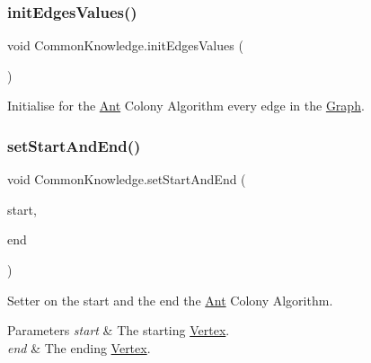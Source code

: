 \subsubsection{\texorpdfstring{init\+Edges\+Values()}{initEdgesValues()}}
{\footnotesize\ttfamily void Common\+Knowledge.\+init\+Edges\+Values (\begin{DoxyParamCaption}{ }\end{DoxyParamCaption})\hspace{0.3cm}{\ttfamily [inline]}}



Initialise for the \hyperlink{classAnt}{Ant} Colony Algorithm every edge in the \hyperlink{classGraph}{Graph}. 

\mbox{\label{classCommonKnowledge_aa62a58eb879f2b8e331ca27f9294162e}} 
\subsubsection{\texorpdfstring{set\+Start\+And\+End()}{setStartAndEnd()}}
{\footnotesize\ttfamily void Common\+Knowledge.\+set\+Start\+And\+End (\begin{DoxyParamCaption}\item[{\hyperlink{classVertexNode}{Vertex\+Node}}]{start,  }\item[{\hyperlink{classVertexNode}{Vertex\+Node}}]{end }\end{DoxyParamCaption})\hspace{0.3cm}{\ttfamily [inline]}}



Setter on the start and the end the \hyperlink{classAnt}{Ant} Colony Algorithm. 


\begin{DoxyParams}{Parameters}
{\em start} & The starting \hyperlink{structVertex}{Vertex}.\\
\hline
{\em end} & The ending \hyperlink{structVertex}{Vertex}.\\
\hline
\end{DoxyParams}
\mbox{\label{classCommonKnowledge_a138990d0224d2ec75140944467f17489}} 
